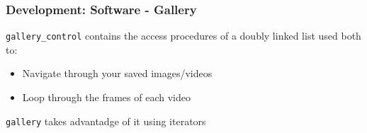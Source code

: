 \documentclass{beamer}
\begin{document}
\begin{frame}
\frametitle{Development: Software - Gallery}

{\tt gallery\_control} contains the access procedures of a doubly linked list used both to:
\begin{itemize}
	\item Navigate through your saved images/videos
	\item Loop through the frames of each video
\end{itemize}

{\tt gallery} takes advantadge of it using iterators

\end{frame}

\end{document}
